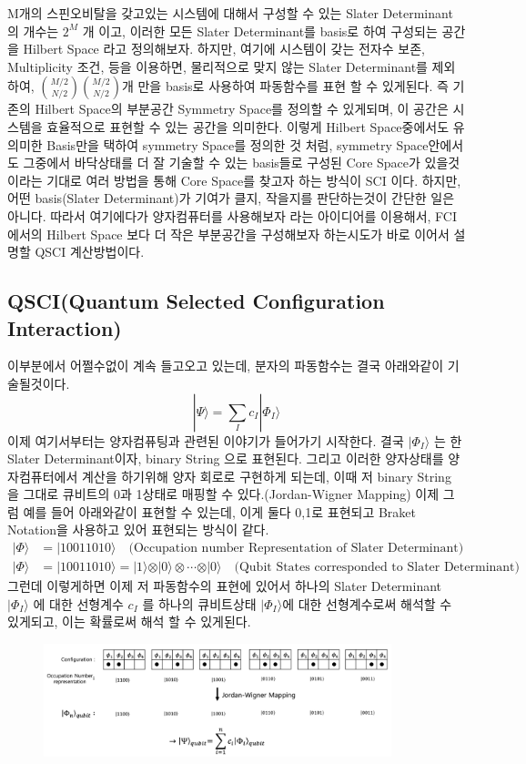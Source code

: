 \documentclass[11pt]{article}
\begin{document}
M개의 스핀오비탈을 갖고있는 시스템에 대해서 구성할 수 있는 Slater Determinant 의 개수는 \(2^M\) 개 이고, 이러한 모든 Slater Determinant를 basis로 하여 구성되는 공간을 Hilbert Space 라고 정의해보자. 
하지만, 여기에 시스템이 갖는 전자수 보존, Multiplicity 조건, 등을 이용하면, 물리적으로 맞지 않는 Slater Determinant를 제외하여, \(\binom{M/2}{N/2}\binom{M/2}{N/2}\)개 만을 basis로 사용하여 파동함수를 
표현 할 수 있게된다. 즉 기존의 Hilbert Space의 부분공간 Symmetry Space를 정의할 수 있게되며, 이 공간은 시스템을 효율적으로 표현할 수 있는 공간을 의미한다.
이렇게 Hilbert Space중에서도 유의미한 Basis만을 택하여 symmetry Space를 정의한 것 처럼, symmetry Space안에서도 그중에서 바닥상태를 더 잘 기술할 수 있는 basis들로 구성된 Core Space가 있을것이라는 
기대로 여러 방법을 통해 Core Space를 찾고자 하는 방식이 SCI 이다. 하지만, 어떤 basis(Slater Determinant)가 기여가 클지, 작을지를 판단하는것이 간단한 일은 아니다.
따라서 여기에다가 양자컴퓨터를 사용해보자 라는 아이디어를 이용해서, FCI 에서의 Hilbert Space 보다 더 작은 부분공간을 구성해보자 하는시도가 바로 이어서 설명할 QSCI 계산방법이다. 


\subsection{QSCI(Quantum Selected Configuration Interaction)}
이부분에서 어쩔수없이 계속 들고오고 있는데, 분자의 파동함수는 결국 아래와같이 기술될것이다. 
\[
|\Psi\rangle = \sum_I c_I |\Phi_I\rangle
\]
이제 여기서부터는 양자컴퓨팅과 관련된 이야기가 들어가기 시작한다. 결국 \(|\Phi_I\rangle\) 는 한 Slater Determinant이자, binary String 으로 표현된다. 
그리고 이러한 양자상태를 양자컴퓨터에서 계산을 하기위해 양자 회로로 구현하게 되는데, 이때 저 binary String 을 그대로 큐비트의 0과 1상태로 매핑할 수 있다.(Jordan-Wigner Mapping)
이제 그럼 예를 들어 아래와같이 표현할 수 있는데, 이게 둘다 0,1로 표현되고 Braket Notation을 사용하고 있어 표현되는 방식이 같다. 
\begin{align*}
|\Phi\rangle  &= \vert 10011010 \rangle \quad \text{(Occupation number Representation of Slater Determinant)} \\
|\Phi\rangle  &= \vert 10011010 \rangle = \vert 1 \rangle \otimes \vert 0 \rangle \otimes \cdots \otimes \vert 0 \rangle \quad \text{(Qubit States corresponded to Slater Determinant)}
\end{align*}
그런데 이렇게하면 이제 저 파동함수의 표현에 있어서 하나의 Slater Determinant \(|\Phi_I\rangle\) 에 대한 선형계수 \(c_I\) 를 
하나의 큐비트상태 \(|\Phi_I\rangle\)에 대한 선형계수로써 해석할 수 있게되고, 이는 확률로써 해석 할 수 있게된다. 
\begin{figure}[htbp]
  \centering
  \includegraphics[width=0.9\textwidth]{fig/QSCI3.png}
  \label{fig:example2}
\end{figure}
\end{document}
